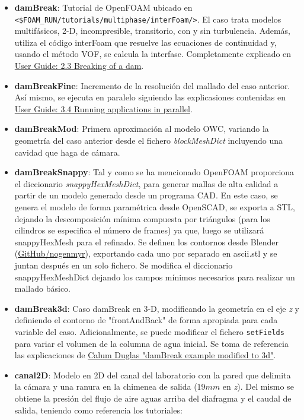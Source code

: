 \begin{itemize}
\item
  \textbf{damBreak}: Tutorial de OpenFOAM ubicado en
  \texttt{\textless{}\$FOAM\_RUN/tutorials/multiphase/interFoam/\textgreater{}}.
  El caso trata modelos multifásicos, 2-D, incompresible, transitorio,
  con y sin turbulencia. Además, utiliza el código interFoam que
  resuelve las ecuaciones de continuidad y, usando el método VOF, se
  calcula la interfase. Completamente explicado en
  \href{http://cfd.direct/openfoam/user-guide/dambreak/}{User Guide: 2.3
  Breaking of a dam}.
\item
  \textbf{damBreakFine}: Incremento de la resolución del mallado del
  caso anterior. Así mismo, se ejecuta en paralelo siguiendo las
  explicasiones contenidas en
  \href{http://cfd.direct/openfoam/user-guide/running-applications-parallel}{User
  Guide: 3.4 Running applications in parallel}.
\item
  \textbf{damBreakMod}: Primera aproximación al modelo OWC, variando la
  geometría del caso anterior desde el fichero \emph{blockMeshDict}
  incluyendo una cavidad que haga de cámara.
\item
  \textbf{damBreakSnappy}: Tal y como se ha mencionado OpenFOAM
  proporciona el diccionario \emph{snappyHexMeshDict}, para generar
  mallas de alta calidad a partir de un modelo generado desde un
  programa CAD. En este caso, se genera el modelo de forma paramétrica
  desde OpenSCAD, se exporta a STL, dejando la descomposición mínima
  compuesta por triángulos (para los cilindros se especifica el número
  de frames) ya que, luego se utilizará snappyHexMesh para el refinado.
  Se definen los contornos desde Blender
  (\href{https://github.com/nogenmyr/swiftBlock}{GitHub/nogenmyr}),
  exportando cada uno por separado en ascii.stl y se juntan después en
  un solo fichero. Se modifica el diccionario snappyHexMeshDict dejando
  los campos mínimos necesarios para realizar un mallado básico.
\item
  \textbf{damBreak3d}: Caso damBreak en 3-D, modificando la geometría en
  el eje \emph{z} y definiendo el contorno de "frontAndBack" de forma
  apropiada para cada variable del caso. Adicionalmente, se puede
  modificar el fichero \texttt{setFields} para variar el volumen de la
  columna de agua inicial. Se toma de referencia las explicaciones de
  \href{http://www.calumdouglas.ch/openfoam-example-3d-dambreak/}{Calum
  Duglas "damBreak example modified to 3d"}.
\item
  \textbf{canal2D}: Modelo en 2D del canal del laboratorio con la pared
  que delimita la cámara y una ranura en la chimenea de salida
  (\(19 mm\) en \emph{z}). Del mismo se obtiene la presión del flujo de
  aire aguas arriba del diafragma y el caudal de salida, teniendo como
  referencia los tutoriales:


\end{itemize}
